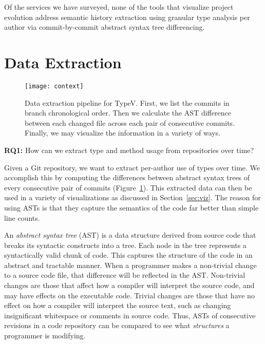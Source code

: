 Of the services we have surveyed, none of the tools that visualize project evolution address semantic history extraction using granular type analysis per author via commit-by-commit abstract syntax tree differencing.

\section{Data Extraction}
\label{sec:methodology}

\begin{figure}[t]
\centering
\texttt{[image: context]}
\caption{Data extraction pipeline for TypeV. First, we list the commits in branch chronological order. Then we calculate the AST difference between each changed file across each pair of consecutive commits. Finally, we may visualize the information in a variety of ways.}
\label{fig:context}
\end{figure}

\textbf{RQ1:} How can we extract type and method usage from repositories over time?

Given a Git repository, we want to extract per-author use of types over time. We accomplish this by computing the differences between abstract syntax trees of every consecutive pair of commits (Figure~\ref{fig:context}). This extracted data can then be used in a variety of visualizations as discussed in Section~\ref{sec:viz}. The reason for using ASTs is that they capture the semantics of the code far better than simple line counts.

An \emph{abstract syntax tree} (AST) is a data structure derived from source code that breaks its syntactic constructs into a tree. Each node in the tree represents a syntactically valid chunk of code. This captures the structure of the code in an abstract and tractable manner. When a programmer makes a non-trivial change to a source code file, that difference will be reflected in the AST\@. Non-trivial changes are those that affect how a compiler will interpret the source code, and may have effects on the executable code. Trivial changes are those that have no effect on how a compiler will interpret the source text, such as changing insignificant whitespace or comments in source code. Thus, ASTs of consecutive revisions in a code repository can be compared to see what \emph{structures} a programmer is modifying.

